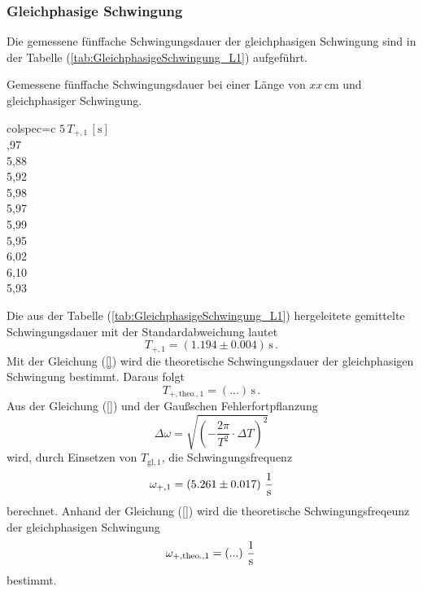 \subsubsection{Gleichphasige Schwingung}
\label{sec:GleichphasigeSchwingung_KuresPendel}
Die gemessene fünffache Schwingungsdauer der gleichphasigen Schwingung sind in der Tabelle (\ref{tab:GleichphasigeSchwingung_L1}) aufgeführt.
\begin{table}[H]
  \centering
  \caption{Gemessene fünffache Schwingungsdauer bei einer Länge von $xx\, \unit{\centi\meter}$ und gleichphasiger Schwingung.}
  \label{tab:GleichphasigeSchwingung_L1}
  \begin{tblr}{colspec={c}}
      \toprule
      $5\, T_{+, 1}\,\left[\unit{\second}\right]$\\
      ,97 \\
      5,88 \\
      5,92 \\
      5,98 \\
      5,97 \\
      5,99 \\
      5,95 \\
      6,02 \\
      6,10 \\
      5,93 \\
      \bottomrule
  \end{tblr}
\end{table}
Die aus der Tabelle (\ref{tab:GleichphasigeSchwingung_L1}) hergeleitete gemittelte Schwingungsdauer mit der Standardabweichung lautet
$$T_{+, 1} = \left( 1.194 \pm 0.004 \right)\,\unit{\second}\,.$$
Mit der Gleichung (\ref{}) wird die theoretische Schwingungsdauer der gleichphasigen Schwingung bestimmt. Daraus folgt
$$T_{+, \text{theo.}, 1} = \left(...\right)\,\unit{\second}\,.$$
Aus der Gleichung (\ref{}) und der Gaußschen Fehlerfortpflanzung 
$$\Delta \omega = \sqrt{\left(-\frac{2 \pi}{T^{2}}\cdot \Delta T \right)^{2}}$$
wird, durch Einsetzen von $T_{\text{gl}, 1}$, die Schwingungsfrequenz
$$\omega_{+, 1} =  \left( 5.261 \pm 0.017 \right)\,\unit[per-mode=fraction]{\per \second}$$ berechnet. 
Anhand der Gleichung (\ref{}) wird die theoretische Schwingungsfreqeunz der gleichphasigen Schwingung 
$$\omega_{+, \text{theo.}, 1} = \left(...\right)\,\unit[per-mode=fraction]{\per \second}\,$$ bestimmt.
%
%
